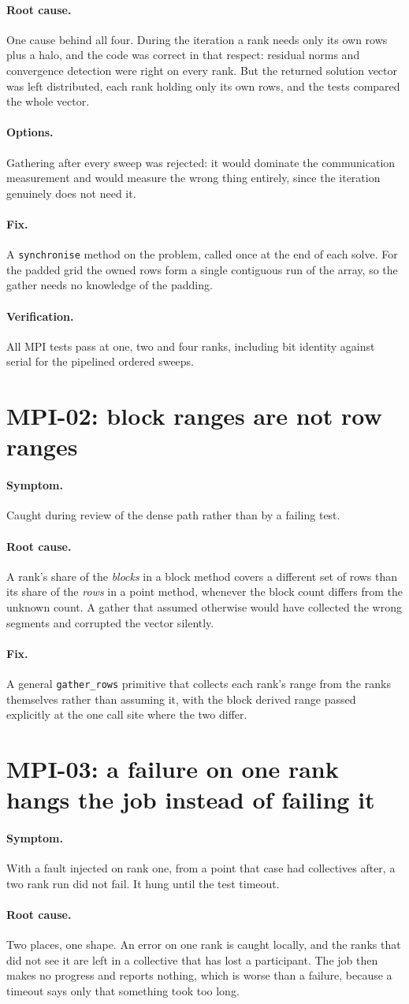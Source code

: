 \documentclass[11pt,a4paper]{report}
\newcommand{\symptom}[1]{\paragraph{Symptom.}#1}
\newcommand{\rootcause}[1]{\paragraph{Root cause.}#1}
\newcommand{\options}[1]{\paragraph{Options.}#1}
\newcommand{\fix}[1]{\paragraph{Fix.}#1}
\newcommand{\verification}[1]{\paragraph{Verification.}#1}
\begin{document}
\rootcause{One cause behind all four. During the iteration a rank needs only its
own rows plus a halo, and the code was correct in that respect: residual norms
and convergence detection were right on every rank. But the returned solution
vector was left distributed, each rank holding only its own rows, and the tests
compared the whole vector.}

\options{Gathering after every sweep was rejected: it would dominate the
communication measurement and would measure the wrong thing entirely, since the
iteration genuinely does not need it.}

\fix{A \texttt{synchronise} method on the problem, called once at the end of each
solve. For the padded grid the owned rows form a single contiguous run of the
array, so the gather needs no knowledge of the padding.}

\verification{All MPI tests pass at one, two and four ranks, including bit
identity against serial for the pipelined ordered sweeps.}

\section{MPI-02: block ranges are not row ranges}

\symptom{Caught during review of the dense path rather than by a failing test.}

\rootcause{A rank's share of the \emph{blocks} in a block method covers a
different set of rows than its share of the \emph{rows} in a point method,
whenever the block count differs from the unknown count. A gather that assumed
otherwise would have collected the wrong segments and corrupted the vector
silently.}

\fix{A general \texttt{gather\_rows} primitive that collects each rank's range
from the ranks themselves rather than assuming it, with the block derived range
passed explicitly at the one call site where the two differ.}

\section{MPI-03: a failure on one rank hangs the job instead of failing it}

\symptom{With a fault injected on rank one, from a point that case had
collectives after, a two rank run did not fail. It hung until the test timeout.}

\rootcause{Two places, one shape. An error on one rank is caught locally, and the
ranks that did not see it are left in a collective that has lost a participant.
The job then makes no progress and reports nothing, which is worse than a
failure, because a timeout says only that something took too long.}
\end{document}
